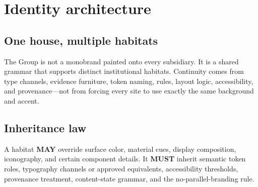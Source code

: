 \documentclass[11pt,twoside,openany]{report}
\newcommand{\MUST}{\textbf{MUST}\xspace}
\newcommand{\MAY}{\textbf{MAY}\xspace}
\begin{document}
\clearpage
\chapter{Identity architecture}

\section{One house, multiple habitats}
The Group is not a monobrand painted onto every subsidiary. It is a shared grammar that supports distinct institutional habitats. Continuity comes from type channels, evidence furniture, token naming, rules, layout logic, accessibility, and provenance---not from forcing every site to use exactly the same background and accent.


\section{Inheritance law}
\begin{specbox}
A habitat \MAY override surface color, material cues, display composition, iconography, and certain component details. It \MUST inherit semantic token roles, typography channels or approved equivalents, accessibility thresholds, provenance treatment, content-state grammar, and the no-parallel-branding rule.
\end{specbox}
\end{document}
